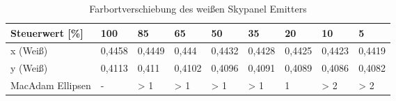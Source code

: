 \documentclass[11pt]{scrartcl}
\begin{document}
\noindent
\begin{table}[H]
    \begin{tabularx}{\textwidth}{|l|X|X|X|X|X|X|X|X|}
        \hline
        Steuerwert [\%]  & 100    & 85     & 65     & 50     & 35     & 20     & 10     & 5      \\\hline
        x (Weiß)         & 0,4458 & 0,4449 & 0,444  & 0,4432 & 0,4428 & 0,4425 & 0,4423 & 0,4419 \\\hline
        y (Weiß)         & 0,4113 & 0,411  & 0,4102 & 0,4096 & 0,4091 & 0,4089 & 0,4086 & 0,4082 \\\hline
        MacAdam Ellipsen & -      & > 1    & > 1    & > 1    & > 1    & 1      & > 2    & > 2    \\\hline
    \end{tabularx}
    \caption{Farbortverschiebung des weißen Skypanel Emitters}
\end{table}
\noindent
\clearpage
\end{document}
